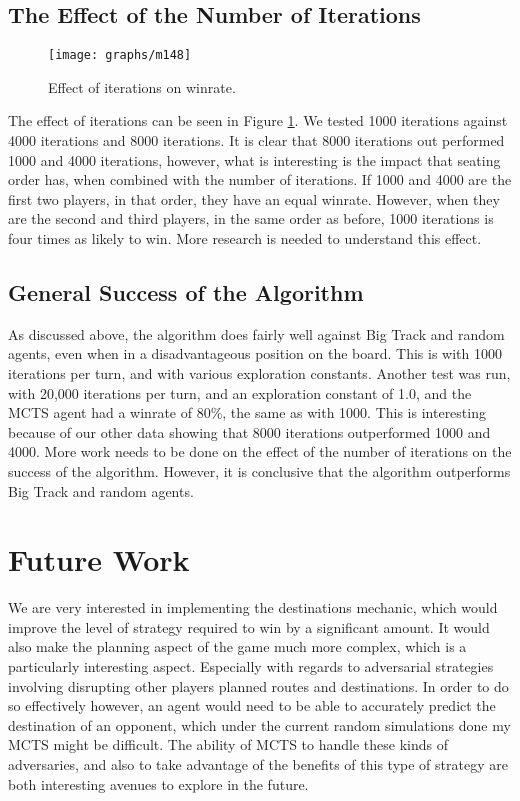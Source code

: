 \documentclass[11pt, letterpaper, twoside]{article}
\begin{document}
\subsection{The Effect of the Number of Iterations}

\begin{figure}
\begin{center}
  \texttt{[image: graphs/m148]}
  \caption{Effect of iterations on winrate.}
  \label{fig:iters}
 \end{center}
\end{figure}

The effect of iterations can be seen in Figure \ref{fig:iters}. We tested 1000 iterations against 4000 iterations and 8000 iterations. It is clear that 8000 iterations out performed 1000 and 4000 iterations, however, what is interesting is the impact that seating order has, when combined with the number of iterations. If 1000 and 4000 are the first two players, in that order, they have an equal winrate. However, when they are the second and third players, in the same order as before, 1000 iterations is four times as likely to win. More research is needed to understand this effect.

\subsection{General Success of the Algorithm}

As discussed above, the algorithm does fairly well against Big Track and random agents, even when in a disadvantageous position on the board. This is with 1000 iterations per turn, and with various exploration constants. Another test was run, with 20,000 iterations per turn, and an exploration constant of 1.0, and the MCTS agent had a winrate of 80\%, the same as with 1000. This is interesting because of our other data showing that 8000 iterations outperformed 1000 and 4000. More work needs to be done on the effect of the number of iterations on the success of the algorithm. However, it is conclusive that the algorithm outperforms Big Track and random agents. 

\section{Future Work}

We are very interested in implementing the destinations mechanic, which would improve the level of strategy required to win by a significant amount. It would also make the planning aspect of the game much more complex, which is a particularly interesting aspect. Especially with regards to adversarial strategies involving disrupting other players planned routes and destinations. In order to do so effectively however, an agent would need to be able to accurately predict the destination of an opponent, which under the current random simulations done my MCTS might be difficult. The ability of MCTS to handle these kinds of adversaries, and also to take advantage of the benefits of this type of strategy are both interesting avenues to explore in the future. 
\end{document}
